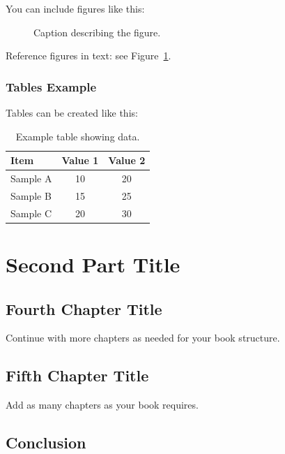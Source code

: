 \documentclass[11pt,a4paper,oneside]{book}
\begin{document}
You can include figures like this:

\begin{figure}[h]
    \centering
    \caption{Caption describing the figure.}
    \label{fig:example}
\end{figure}

Reference figures in text: see Figure~\ref{fig:example}.

\section{Tables Example}
\label{sec:tables}

Tables can be created like this:

\begin{table}[h]
    \centering
    \caption{Example table showing data.}
    \label{tab:example}
    \begin{tabular}{lcc}
        \hline
        \textbf{Item} & \textbf{Value 1} & \textbf{Value 2} \\
        \hline
        Sample A & 10 & 20 \\
        Sample B & 15 & 25 \\
        Sample C & 20 & 30 \\
        \hline
    \end{tabular}
\end{table}

\part{Second Part Title}

\chapter{Fourth Chapter Title}
\label{chap:fourth}

Continue with more chapters as needed for your book structure.

\chapter{Fifth Chapter Title}
\label{chap:fifth}

Add as many chapters as your book requires.

\chapter{Conclusion}
\label{chap:conclusion}
\end{document}
